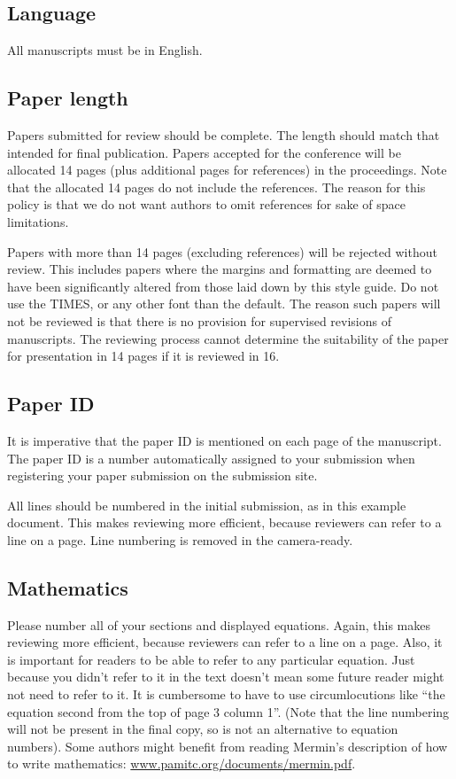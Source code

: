 \documentclass[runningheads]{llncs}
\begin{document}
\subsection{Language}

All manuscripts must be in English.

\subsection{Paper length}
Papers submitted for review should be complete. 
The length should match that intended for final publication. 
Papers accepted for the conference will be allocated 14 pages (plus additional pages for references) in the proceedings. 
Note that the allocated 14 pages do not include the references. The reason for this policy
is that we do not want authors to omit references for sake of space limitations.

Papers with more than 14 pages (excluding references) will be rejected without review.
This includes papers where the margins and
formatting are deemed to have been significantly altered from those
laid down by this style guide. Do not use the TIMES, or any other font than the default. The reason such papers will not be reviewed is that there is no provision for supervised revisions of manuscripts. The reviewing process cannot determine the suitability of the paper for presentation in 14 pages if it is reviewed in 16.

\subsection{Paper ID}

It is imperative that the paper ID is mentioned on each page of the manuscript.
The paper ID is a number automatically assigned to your submission when 
registering your paper submission on the submission site.



All lines should be numbered in the initial submission, as in this example document. This makes reviewing more efficient, because reviewers can refer to a line on a page. Line numbering is removed in the camera-ready.


\subsection{Mathematics}

Please number all of your sections and displayed equations.  Again,
this makes reviewing more efficient, because reviewers can refer to a
line on a page.  Also, it is important for readers to be able to refer
to any particular equation.  Just because you didn't refer to it in
the text doesn't mean some future reader might not need to refer to
it.  It is cumbersome to have to use circumlocutions like ``the
equation second from the top of page 3 column 1''.  (Note that the
line numbering will not be present in the final copy, so is not an
alternative to equation numbers).  Some authors might benefit from
reading Mermin's description of how to write mathematics:
\url{www.pamitc.org/documents/mermin.pdf}.
\end{document}
